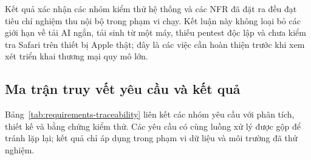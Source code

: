 Kết quả xác nhận các nhóm kiểm thử hệ thống và các NFR đã đặt ra đều đạt tiêu chí nghiệm thu nội bộ trong phạm vi chạy. Kết luận này không loại bỏ các giới hạn về tải AI ngắn, tải sinh từ một máy, thiếu pentest độc lập và chưa kiểm tra Safari trên thiết bị Apple thật; đây là các việc cần hoàn thiện trước khi xem xét triển khai thương mại quy mô lớn.

\subsection{Ma trận truy vết yêu cầu và kết quả}

Bảng~\ref{tab:requirements-traceability} liên kết các nhóm yêu cầu với phân tích, thiết kế và bằng chứng kiểm thử. Các yêu cầu có cùng luồng xử lý được gộp để tránh lặp lại; kết quả chỉ áp dụng trong phạm vi dữ liệu và môi trường đã thử nghiệm.

